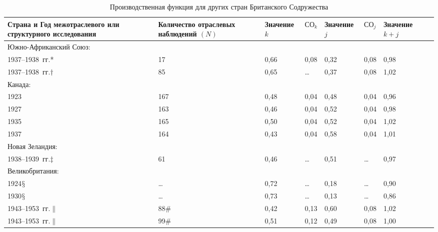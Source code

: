 \documentclass{article}
\begin{document}
\begin{table}[!t]
\centering
\footnotesize{
\caption{Производственная функция для других стран Британского Содружества}%
\label{tab3}%
\begin{tabular}{p{}p{}p{}p{}p{}p{}p{}p{0pt}}
\toprule
\toprule
\centering Страна и Год межотраслевого или структурного исследования & \centering Количество отраслевых наблюдений \((N)\) & \centering Значение \(k\) & \centering \(\text{СО}_k\) & \centering Значение \(j\) & \centering \(\text{СО}_j\) & \centering Значение \(k + j\) & \\%
\midrule
Южно-Африканский Союз: & & & & & & &\\
\hspace{3mm} 1937--1938~гг.* & \hfil \phantom{\,} 17 & \hfil 0,66 & \hfil 0,08 & \hfil 0,32 & \hfil 0,08 & \hfil 0,98 &\\
\hspace{3mm} 1937--1938~гг.$\dagger$ & \hfil \phantom{\,} 85 & \hfil 0,65 & \hfil \dots & \hfil 0,37 & \hfil 0,08 & \hfil 1,02&\\
Канада: & & & & & & &\\
\hspace{3mm} 1923 & \hfil 167 & \hfil 0,48 & \hfil 0,04 & \hfil 0,48 & \hfil 0,04 & \hfil 0,96&\\
\hspace{3mm} 1927 & \hfil 163 & \hfil 0,46 & \hfil 0,04 & \hfil 0,52 & \hfil 0,04 & \hfil 0,98&\\
\hspace{3mm} 1935 & \hfil 165 & \hfil 0,50 & \hfil 0,04 & \hfil 0,52 & \hfil 0,04 & \hfil 1,02&\\
\hspace{3mm} 1937 & \hfil 164 & \hfil 0,43 & \hfil 0,04 & \hfil 0,58 & \hfil 0,04 & \hfil 1,01&\\
Новая Зеландия: & & & & & & &\\
\hspace{3mm} 1938--1939~гг.$\ddagger$ & \hfil \phantom{\,} 61 & \hfil 0,46 & \hfil \dots & \hfil 0,51 & \hfil \dots & \hfil 0,97&\\
Великобритания: & & & & & & &\\
\hspace{3mm} 1924$\mathsection$ & \hfil \dots & \hfil 0,72 & \hfil \dots & \hfil 0,18 & \hfil \dots & \hfil 0,90&\\
\hspace{3mm} 1930$\mathsection$ & \hfil \dots & \hfil 0,73 & \hfil \dots & \hfil 0,13 & \hfil \dots & \hfil 0,86&\\
\hspace{3mm} 1943--1953~гг.$\|$ & \hfil \phantom{M} 88$\#$ & \hfil 0,42 & \hfil 0,13 & \hfil 0,60 & \hfil 0,08 & \hfil 1,02&\\
\hspace{3mm} 1943--1953~гг.$\|$ & \hfil \phantom{M} 99$\#$ & \hfil 0,51 & \hfil 0,12 & \hfil 0,49 & \hfil 0,08 & \hfil 1,00&\\


\end{tabular}}
\end{table}
\end{document}
